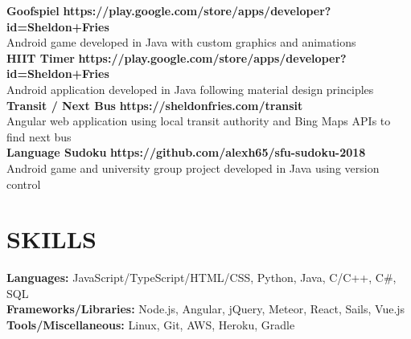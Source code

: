 \documentclass[margin,line]{resume}
\begin{document}
\begin{resume}
    \textbf{\listing Goofspiel} \hfill \textbf{https://play.google.com/store/apps/developer?id=Sheldon+Fries} \vspace{1mm}\\
    Android game developed in Java with custom graphics and animations\\
    
    \textbf{\listing HIIT Timer} \hfill \textbf{https://play.google.com/store/apps/developer?id=Sheldon+Fries} \vspace{1mm}\\
    Android application developed in Java following material design principles\\
    
    \textbf{\listing Transit / Next Bus} \hfill \textbf{https://sheldonfries.com/transit} \vspace{1mm}\\
    Angular web application using local transit authority and Bing Maps APIs to find next bus\\
    
    \textbf{\listing Language Sudoku} \hfill \textbf{https://github.com/alexh65/sfu-sudoku-2018} \vspace{1mm}\\
    Android game and university group project developed in Java using version control\\

    \vspace{-1mm}

\sectionline

    \section{\mysidestyle \textbf{\large{S}\small{KILLS}}}

    \textbf{Languages:} JavaScript/TypeScript/HTML/CSS, Python, Java, C/C++, C\#, SQL\\
    \textbf{Frameworks/Libraries:} Node.js, Angular, jQuery, Meteor, React, Sails, Vue.js\\
    \textbf{Tools/Miscellaneous:} Linux, Git, AWS, Heroku, Gradle\\


\end{resume}
\end{document}
